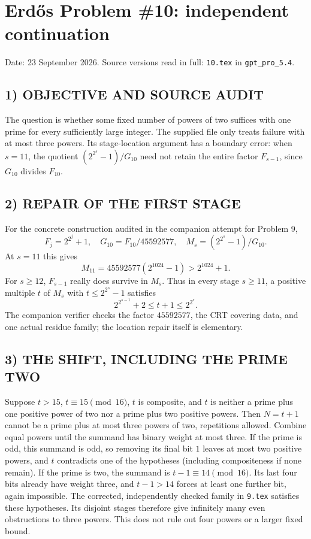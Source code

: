\section{Erd\H{o}s Problem \#10: independent continuation}
\noindent Date: 23 September 2026. Source versions read in full: \texttt{10.tex} in \texttt{gpt\_pro\_5.4}.

\subsection*{1) OBJECTIVE AND SOURCE AUDIT}
The question is whether some fixed number of powers of two suffices with one prime for every sufficiently large integer. The supplied file only treats failure with at most three powers. Its stage-location argument has a boundary error: when $s=11$, the quotient $(2^{2^s}-1)/G_{10}$ need not retain the entire factor $F_{s-1}$, since $G_{10}$ divides $F_{10}$.
\subsection*{2) REPAIR OF THE FIRST STAGE}
For the concrete construction audited in the companion attempt for Problem 9,
\[
F_j=2^{2^j}+1,\quad G_{10}=F_{10}/45592577,
\quad M_s=(2^{2^s}-1)/G_{10}.
\]
At $s=11$ this gives
\[
M_{11}=45592577(2^{1024}-1)>2^{1024}+1.
\]
For $s\ge12$, $F_{s-1}$ really does survive in $M_s$. Thus in every stage $s\ge11$, a positive multiple $t$ of $M_s$ with $t\le2^{2^s}-1$ satisfies
\[
2^{2^{s-1}}+2\le t+1\le2^{2^s}.
\]
The companion verifier checks the factor $45592577$, the CRT covering data, and one actual residue family; the location repair itself is elementary.
\subsection*{3) THE SHIFT, INCLUDING THE PRIME TWO}
Suppose $t>15$, $t\equiv15\pmod{16}$, $t$ is composite, and $t$ is neither a prime plus one positive power of two nor a prime plus two positive powers. Then $N=t+1$ cannot be a prime plus at most three powers of two, repetitions allowed. Combine equal powers until the summand has binary weight at most three. If the prime is odd, this summand is odd, so removing its final bit $1$ leaves at most two positive powers, and $t$ contradicts one of the hypotheses (including compositeness if none remain). If the prime is two, the summand is $t-1\equiv14\pmod{16}$. Its last four bits already have weight three, and $t-1>14$ forces at least one further bit, again impossible.
The corrected, independently checked family in \texttt{9.tex} satisfies these hypotheses. Its disjoint stages therefore give infinitely many even obstructions to three powers. This does not rule out four powers or a larger fixed bound.
